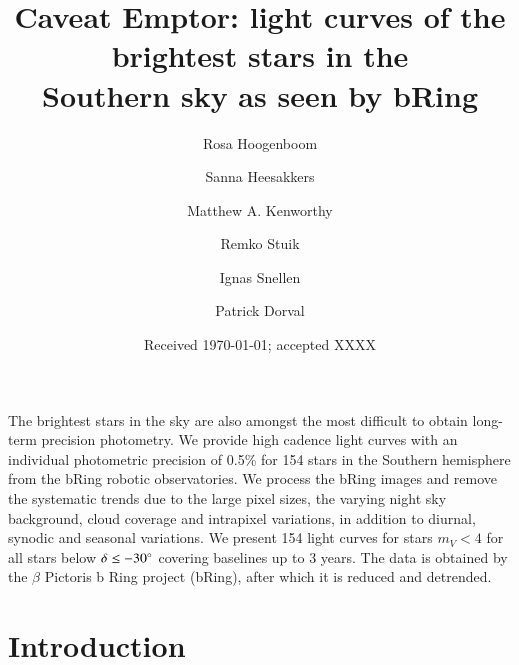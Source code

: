 \documentclass{aa}
\begin{document}
 

   \title{Caveat Emptor: light curves of the brightest stars in the \\ Southern sky as seen by bRing}

   \author{Rosa Hoogenboom
          \and
          Sanna Heesakkers
          \and
          Matthew A. Kenworthy
          \and
          Remko Stuik
          \and
          Ignas Snellen
          \and
          Patrick Dorval
          }


   \date{Received \today; accepted XXXX}

 
  \abstract
   {The brightest stars in the sky are also amongst the most difficult to obtain long-term precision photometry. }
   {We provide high cadence light curves with an individual photometric precision of 0.5\% for 154 stars in the Southern hemisphere from the bRing robotic observatories.}
   {We process the bRing images and remove the systematic trends due to the large pixel sizes, the varying night sky background, cloud coverage and intrapixel variations, in addition to diurnal, synodic and seasonal variations.}
   {We present 154 light curves for stars $m_V<4$ for all stars below $\delta \leq -30^\circ $ covering baselines up to 3 years. The data is obtained by the $\beta$ Pictoris b Ring project (bRing), after which it is reduced and detrended.}
   {}


   \maketitle
%

\section{Introduction}
\end{document}
